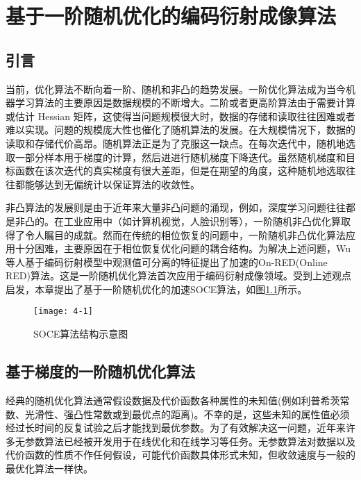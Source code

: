 \chapter{基于一阶随机优化的编码衍射成像算法}
\label{chap:stochastic}
\section{引言}
当前，优化算法不断向着一阶、随机和非凸的趋势发展。一阶优化算法成为当今机器学习算法的主要原因是数据规模的不断增大。二阶或者更高阶算法由于需要计算或估计 Hessian 矩阵，这使得当问题规模很大时，数据的存储和读取往往困难或者难以实现。问题的规模庞大性也催化了随机算法的发展。在大规模情况下，数据的读取和存储代价高昂。随机算法正是为了克服这一缺点。在每次迭代中，随机地选取一部分样本用于梯度的计算，然后进进行随机梯度下降迭代。虽然随机梯度和目标函数在该次迭代的真实梯度有很大差距，但是在期望的角度，这种随机地选取往往都能够达到无偏统计以保证算法的收敛性。

非凸算法的发展则是由于近年来大量非凸问题的涌现，例如，深度学习问题往往都是非凸的。在工业应用中（如计算机视觉，人脸识别等），一阶随机非凸优化算取得了令人瞩目的成就。然而在传统的相位恢复的问题中，一阶随机非凸优化算法应用十分困难，主要原因在于相位恢复优化问题的耦合结构。为解决上述问题，Wu等人基于编码衍射模型中观测值可分离的特征提出了加速的On-RED(Online RED)算法。这是一阶随机优化算法首次应用于编码衍射成像领域。受到上述观点启发，本章提出了基于一阶随机优化的加速SOCE算法，如图\ref{fig:4-1}所示。
\begin{figure}[!hptb]
	\centering
	\texttt{[image: 4-1]}
	\caption{SOCE算法结构示意图}\label{fig:4-1}
\end{figure}

\section{基于梯度的一阶随机优化算法}
经典的随机优化算法通常假设数据及代价函数各种属性的未知值(例如利普希茨常数、光滑性、强凸性常数或到最优点的距离)\supercite{Sun1,Sun2,Dongruo,Danilova,Chambolle2}。不幸的是，这些未知的属性值必须经过长时间的反复试验之后才能找到最优参数。为了有效解决这一问题，近年来许多无参数算法已经被开发用于在线优化和在线学习等任务。无参数算法对数据以及代价函数的性质不作任何假设，可能代价函数具体形式未知，但收敛速度与一般的最优化算法一样快。

